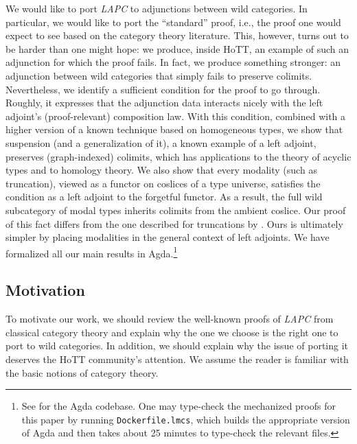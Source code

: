 \documentclass[10pt,a4paper]{article}
\theoremstyle{definition}
\theoremstyle{remark}
\newcommand{\0}{\mathbf{0}}
\newcommand{\1}{\mathbf{1}}
\newcommand{\2}{\mathbf{2}}
\begin{document}
We would like to port \emph{LAPC} to adjunctions between wild categories. In particular, we would like to port the ``standard'' proof, i.e., the proof one would expect to see based on the category theory literature. This, however, turns out to be harder than one might hope: we produce, inside HoTT, an example of such an adjunction for which the proof fails. In fact, we produce something stronger: an adjunction between wild categories that simply fails to preserve colimits. Nevertheless, we identify a sufficient condition for the proof to go through. Roughly, it expresses that the adjunction data interacts nicely with the left adjoint's (proof-relevant) composition law. With this condition, combined with a higher version of a known technique based on homogeneous types, we show that suspension (and a generalization of it), a known example of a left adjoint, preserves (graph-indexed) colimits, which has applications to the theory of acyclic types and to homology theory. We also show that every modality (such as truncation), viewed as a functor on coslices of a type universe, satisfies the condition as a left adjoint to the forgetful functor. As a result, the full wild subcategory of modal types inherits colimits from the ambient coslice. Our proof of this fact differs from the one described for truncations by \cite[Section 7.4]{Uni13}. Ours is ultimately simpler by placing modalities in the general context of left adjoints. We have formalized all our main results in Agda.\footnote{See \cite{2cohagda-pub} for the Agda codebase. One may type-check the mechanized proofs for this paper by running \texttt{Dockerfile.lmcs}, which builds the appropriate version of Agda and then takes about 25 minutes to type-check the relevant files.} 

\subsection{Motivation}

To motivate our work, we should review the well-known proofs of \emph{LAPC} from classical category theory and explain why the one we choose is the right one to port to wild categories. In addition, we should explain why the issue of porting it deserves the HoTT community's attention. We assume the reader is familiar with the basic notions of category theory.
\end{document}
